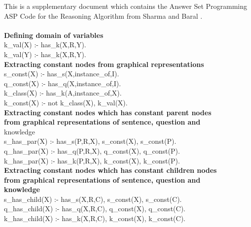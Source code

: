 \label{AppendixA}
This is a supplementary document which contains the Answer Set Programming
ASP Code for the Reasoning Algorithm from Sharma and Baral \cite{2018CommonsenseKT}.\\
\\
\textbf{Defining domain of variables}\\
k\_val(X) :- has\_k(X,R,Y).\\
k\_val(Y) :- has\_k(X,R,Y).\\

\textbf{Extracting constant nodes from graphical representations}\\
s\_const(X) :- has\_s(X,instance\_of,I).\\
q\_const(X) :- has\_q(X,instance\_of,I).\\
k\_class(X) :- has\_k(A,instance\_of,X).\\
k\_const(X) :- not k\_class(X), k\_val(X).\\

\textbf{Extracting constant nodes which has constant parent nodes\\
from graphical representations of sentence, question and}\\
knowledge\\
s\_has\_par(X) :- has\_s(P,R,X), s\_const(X), s\_const(P).\\
q\_has\_par(X) :- has\_q(P,R,X), q\_const(X), q\_const(P).\\
k\_has\_par(X) :- has\_k(P,R,X), k\_const(X), k\_const(P).\\

\textbf{Extracting constant nodes which has constant children nodes\\
from graphical representations of sentence, question and\\
knowledge}\\
s\_has\_child(X) :- has\_s(X,R,C), s\_const(X), s\_const(C).\\
q\_has\_child(X) :- has\_q(X,R,C), q\_const(X), q\_const(C).\\
k\_has\_child(X) :- has\_k(X,R,C), k\_const(X), k\_const(C).\\

